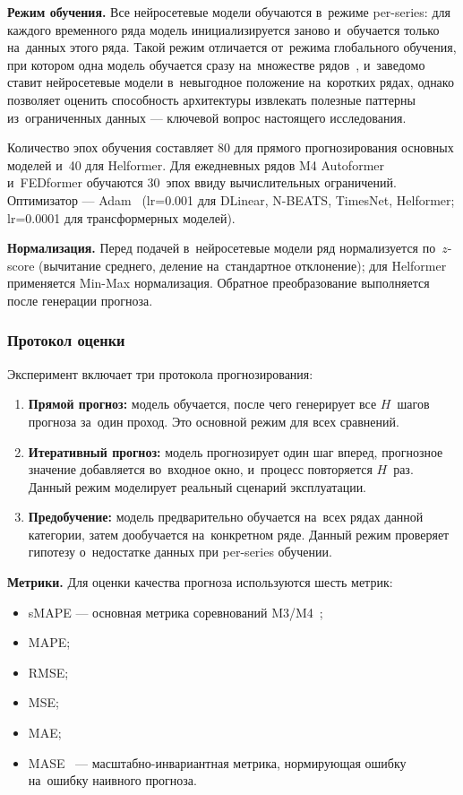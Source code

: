 \textbf{Режим обучения.} Все нейросетевые модели обучаются в~режиме
per-series: для каждого временного ряда модель инициализируется заново
и~обучается только на~данных этого ряда. Такой режим отличается от~режима
глобального обучения, при котором одна модель обучается сразу на~множестве
рядов~\cite{bandara2020forecasting}, и~заведомо ставит нейросетевые
модели в~невыгодное положение на~коротких рядах, однако позволяет
оценить способность архитектуры извлекать полезные паттерны из~ограниченных
данных --- ключевой вопрос настоящего исследования.

Количество эпох обучения составляет 80 для прямого прогнозирования
основных моделей и~40 для Helformer. Для ежедневных рядов M4
Autoformer и~FEDformer обучаются 30~эпох ввиду вычислительных ограничений.
Оптимизатор --- Adam~\cite{kingma2015adam} (lr=0.001 для DLinear, N-BEATS,
TimesNet, Helformer; lr=0.0001 для трансформерных моделей).

\textbf{Нормализация.} Перед подачей в~нейросетевые модели ряд
нормализуется по~$z$-score (вычитание среднего, деление на~стандартное
отклонение); для Helformer применяется Min-Max нормализация.
Обратное преобразование выполняется после генерации прогноза.

\subsubsection{Протокол оценки}
\label{sssec:protocol}

Эксперимент включает три протокола прогнозирования:

\begin{enumerate}[nosep]
\item \textbf{Прямой прогноз:} модель обучается, после чего
  генерирует все $H$~шагов прогноза за~один проход. Это основной
  режим для всех сравнений.
\item \textbf{Итеративный прогноз:} модель прогнозирует
  один шаг вперед, прогнозное значение добавляется во~входное окно,
  и~процесс повторяется $H$~раз. Данный режим моделирует реальный
  сценарий эксплуатации.
\item \textbf{Предобучение:} модель предварительно обучается
  на~всех рядах данной категории, затем дообучается на~конкретном ряде.
  Данный режим проверяет гипотезу о~недостатке данных при per-series
  обучении.
\end{enumerate}

\textbf{Метрики.} Для оценки качества прогноза используются шесть метрик:
\begin{itemize}[nosep]
\item sMAPE --- основная метрика
  соревнований M3/M4~\cite{hyndman2006accuracy};
\item MAPE;
\item RMSE;
\item MSE;
\item MAE;
\item MASE~\cite{hyndman2006accuracy} ---
  масштабно-инвариантная метрика, нормирующая ошибку на~ошибку наивного
  прогноза.
\end{itemize}

